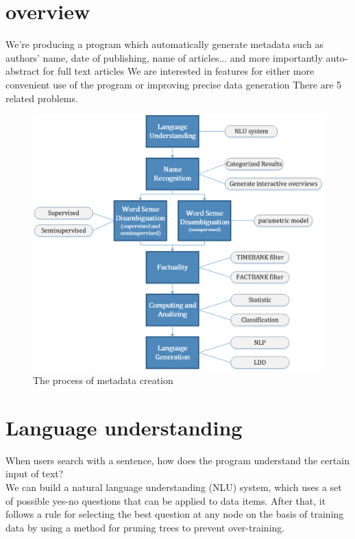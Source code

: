 \section*{overview}

We're producing a program which automatically generate metadata such as authors' name, date of publishing, name of articles... and more importantly auto-abstract for full text articles
We are interested in features for either more convenient use of the program or improving precise data generation
There are 5 related problems.\\
\begin{figure}
	\caption{The process of metadata creation}
\begin{center}
	\includegraphics[width=\columnwidth]{UnionChart}
\end{center}
\end{figure}

\section*{Language understanding}

When users search with a sentence, how does the program understand the certain input of text? \\

We can build a natural language understanding (NLU) system, which uses a set of possible yes-no questions that can be applied to data items. After that, it follows a rule for selecting the best question at any node on the basis of training data by using a method for pruning trees to prevent over-training.


